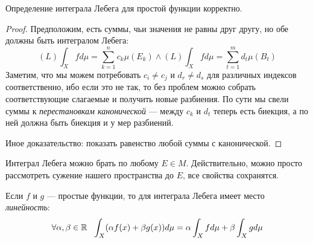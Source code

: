 \begin{proposition}
	Определение интеграла Лебега для простой функции корректно.
\end{proposition}

\begin{proof}
	Предположим, есть суммы, чьи значения не равны друг другу, но обе должны быть интегралом Лебега:
	\[
		(L)\int_X fd\mu = \sum_{k = 1}^n c_k \mu(E_k) \wedge (L)\int_X fd\mu = \sum_{t = 1}^m d_t \mu(B_t)
	\]
	Заметим, что мы можем потребовать $c_i \neq c_j$ и $d_r \neq d_s$ для различных индексов соответственно, ибо если это не так, то без проблем можно собрать соответствующие слагаемые и получить новые разбиения. По сути мы свели суммы к \textit{перестановкам канонической} --- между $c_k$ и $d_t$ теперь есть биекция, а по ней должна быть биекция и у мер разбиений.
	
	Иное доказательство: показать равенство любой суммы с канонической.
\end{proof}

\begin{note}
	Интеграл Лебега можно брать по любому $E \in M$. Действительно, можно просто рассмотреть сужение нашего пространства до $E$, все свойства сохранятся.
\end{note}

\begin{theorem}
	Если $f$ и $g$ --- простые функции, то для интеграла Лебега имеет место \textit{линейность}:
	\[
		\forall \alpha, \beta \in \mathbb{R}\ \ \int_X (\alpha f(x) + \beta g(x))d\mu = \alpha \int_X fd\mu + \beta \int_X gd\mu
	\]
\end{theorem}

